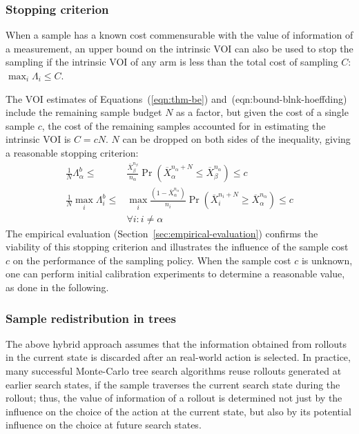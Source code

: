 \subsubsection{Stopping criterion}
\label{sec:control-stopping-criterion}

When a sample has a known cost commensurable with the value of
information of a measurement, an upper bound on the intrinsic VOI can also
be used to stop the sampling if the intrinsic VOI of any arm
is less than the total cost of sampling $C$: $\max_i \Lambda_i \le C$.

The VOI estimates of Equations~(\ref{eqn:thm-be}) and~({eqn:bound-blnk-hoeffding})
include the remaining sample budget $N$ as a
factor, but given the cost of a single sample $c$, the cost of the
remaining samples accounted for in estimating the intrinsic VOI is
$C=cN$. $N$ can be dropped on both sides of the inequality,
giving a reasonable stopping criterion:
\begin{align}
\frac 1 N \Lambda_\alpha^b \le&\frac {\overline X_\beta^{n_\beta}}
  {n_\alpha}\Pr(\overline X_\alpha^{n_\alpha+N}\le\overline
  X_\beta^{n_\alpha})\le c\nonumber\\
\frac 1 N \max_i\Lambda_i^b\le &\max_i\frac {(1-\overline X_\alpha^{n_\alpha})} {n_i}\Pr(\overline
  X_i^{n_i+N}\ge\overline X_\alpha^{n_\alpha})\le c\nonumber\\
    &\forall i: i\ne\alpha
\label{eqn:stopping-blnk}
\end{align}
The empirical evaluation (Section~\ref{sec:empirical-evaluation})
confirms the viability of this stopping criterion and illustrates the
influence of the sample cost $c$ on the performance of
the sampling policy. When the sample cost $c$ is unknown, one can perform initial calibration experiments
to determine a reasonable value, as done in the following.

\subsubsection{Sample redistribution in trees}
\label{sec:control-redistribution}

The above hybrid approach assumes
that the information obtained from rollouts in the
current state is discarded after an real-world action is selected. In practice,
many successful Monte-Carlo tree search algorithms reuse rollouts
generated at earlier search states, if the sample traverses the
current search state during the rollout; thus, the value of information of a rollout is
determined not just by the influence on the choice of the action at
the current state, but also by its potential influence on the choice at future
search states.

